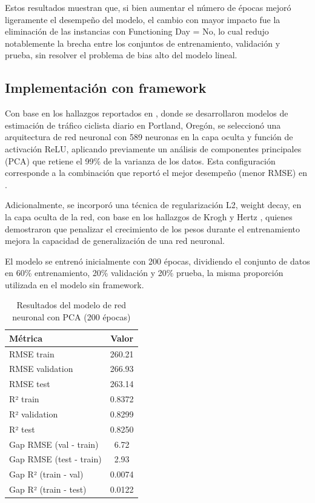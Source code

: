 \documentclass[10pt,journal,compsoc]{IEEEtran}
\begin{document}
Estos resultados muestran que, si bien aumentar el número de épocas mejoró ligeramente el desempeño del modelo, el cambio con mayor impacto fue la eliminación de las instancias con Functioning Day = No, lo cual redujo notablemente la brecha entre los conjuntos de entrenamiento, validación y prueba, sin resolver el problema de bias alto del modelo lineal.

\subsection{Implementación con framework}
\label{sec:framework}

Con base en los hallazgos reportados en \cite{paper}, donde se desarrollaron modelos de estimación de tráfico ciclista diario en Portland, Oregón, se seleccionó una arquitectura de red neuronal con 589 neuronas en la capa oculta y función de activación ReLU, aplicando previamente un análisis de componentes principales (PCA) que retiene el 99\% de la varianza de los datos. Esta configuración corresponde a la combinación que reportó el mejor desempeño (menor RMSE) en \cite{paper}.

Adicionalmente, se incorporó una técnica de regularización L2, weight decay, en la capa oculta de la red, con base en los hallazgos de Krogh y Hertz \cite{weight}, quienes demostraron que penalizar el crecimiento de los pesos durante el entrenamiento mejora la capacidad de generalización de una red neuronal. 


El modelo se entrenó inicialmente con 200 épocas, dividiendo el conjunto de datos en 60\% entrenamiento, 20\% validación y 20\% prueba, la misma proporción utilizada en el modelo sin framework.

\begin{table}[H]
\centering
\caption{Resultados del modelo de red neuronal con PCA (200 épocas)}
\label{tab:frameworkNN}
\begin{tabular}{|l|c|}
\hline
\textbf{Métrica} & \textbf{Valor} \\
\hline
RMSE train & 260.21 \\
RMSE validation & 266.93 \\
RMSE test & 263.14 \\
\hline
R² train & 0.8372 \\
R² validation & 0.8299 \\
R² test & 0.8250 \\
\hline
Gap RMSE (val - train) & 6.72 \\
Gap RMSE (test - train) & 2.93 \\
Gap R² (train - val) & 0.0074 \\
Gap R² (train - test) & 0.0122 \\
\hline
\end{tabular}
\end{table}
\end{document}
